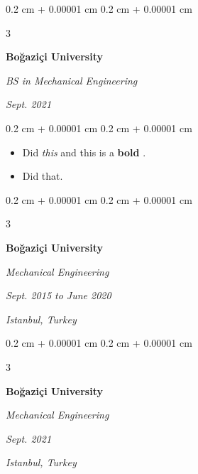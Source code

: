 \documentclass[10pt, letterpaper]{article}
\newenvironment{highlights}{
    \begin{itemize}[
        topsep=0.10 cm,
        parsep=0.10 cm,
        partopsep=0pt,
        itemsep=0pt,
        leftmargin=0.4 cm + 10pt + 0.6 cm
    ]
}{
    \end{itemize}
} %
\newenvironment{onecolentry}{
    \begin{adjustwidth}{
        0.2 cm + 0.00001 cm
    }{
        0.2 cm + 0.00001 cm
    }
}{
    \end{adjustwidth}
} %
\newenvironment{threecolentry}[3][]{
    \onecolentry
    \def\thirdColumn{#3}
    \setcolumnwidth{0.6 cm, \fill, 4.1 cm}
    \begin{paracol}{3}
    #2 \switchcolumn
}{
    \switchcolumn \raggedleft \thirdColumn
    \end{paracol}
    \endonecolentry
} %
\let\hrefWithoutArrow\href
\renewcommand{\href}[2]{\hrefWithoutArrow{#1}{\mbox{\ifthenelse{\equal{#2}{}}{ }{#2 }\raisebox{.15ex}{\footnotesize \faExternalLink*}}}}
\begin{document}
        \vspace{0.2 cm}

        \begin{threecolentry}{
            \vspace*{\fill}
            \textbullet
            \vspace*{3px}
            \vspace*{\fill}
        }{
        \textit{Sept. 2021}
            
        }
            \textbf{Boğaziçi University}

            \textit{BS in Mechanical Engineering}
        \end{threecolentry}

        \vspace{0.10 cm}
        \begin{onecolentry}
            \begin{highlights}
                \item Did \textit{this} and this is a \textbf{bold} \href{https://example.com}{link}.
                \item Did that.
            \end{highlights}
        \end{onecolentry}


        \vspace{0.2 cm}

        \begin{threecolentry}{
            \vspace*{\fill}
            \textbullet
            \vspace*{3px}
            \vspace*{\fill}
        }{
        \textit{Sept. 2015 to June 2020}
            
        \textit{Istanbul, Turkey}}
            \textbf{Boğaziçi University}

            \textit{Mechanical Engineering}
        \end{threecolentry}



        \vspace{0.2 cm}

        \begin{threecolentry}{
            \vspace*{\fill}
            \textbullet
            \vspace*{3px}
            \vspace*{\fill}
        }{
        \textit{Sept. 2021}
            
        \textit{Istanbul, Turkey}}
            \textbf{Boğaziçi University}

            \textit{Mechanical Engineering}
        \end{threecolentry}
\end{document}
